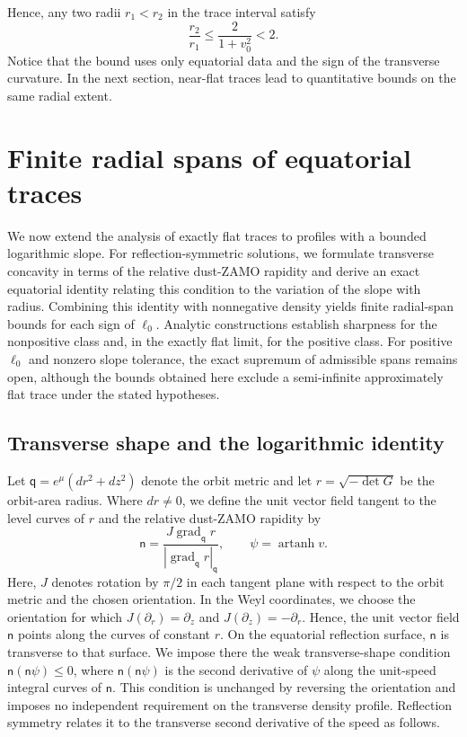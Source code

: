 \documentclass[amsmath,amsfonts,amssymb,aps,pra,superscriptaddress,10pt]{revtex4-2}
\numberwithin{equation}{section}
\theoremstyle{plain}
\theoremstyle{definition}
\theoremstyle{remark}
\theoremstyle{definition}
\newcommand{\ellzero}{\ell_0}
\begin{document}
Hence, any two radii $r_1<r_2$ in the trace interval satisfy
\begin{equation}
\frac{r_2}{r_1}\leq\frac{2}{1+v_0^2}<2.
\end{equation}
Notice that the bound uses only equatorial data and the sign of the transverse curvature. In the next section, near-flat traces lead to quantitative bounds on the same radial extent.


\section{Finite radial spans of equatorial traces}
\label{approxflatconstraint}

We now extend the analysis of exactly flat traces to profiles with a bounded logarithmic slope. For reflection-symmetric solutions, we formulate transverse concavity in terms of the relative dust-ZAMO rapidity and derive an exact equatorial identity relating this condition to the variation of the slope with radius. Combining this identity with nonnegative density yields finite radial-span bounds for each sign of $\ellzero$. Analytic constructions establish sharpness for the nonpositive class and, in the exactly flat limit, for the positive class. For positive $\ellzero$ and nonzero slope tolerance, the exact supremum of admissible spans remains open, although the bounds obtained here exclude a semi-infinite approximately flat trace under the stated hypotheses.

\subsection{Transverse shape and the logarithmic identity}

Let $\mathsf{q}=e^\mu(dr^2+dz^2)$ denote the orbit metric and let $r=\sqrt{-\det G}$ be the orbit-area radius. Where $dr\neq 0$, we define the unit vector field tangent to the level curves of $r$ and the relative dust-ZAMO rapidity by
\begin{equation}
\mathsf{n}=\frac{J\operatorname{grad}_{\mathsf{q}}r}
{\left|\operatorname{grad}_{\mathsf{q}}r\right|_{\mathsf{q}}},
\qquad 
\psi=\operatorname{artanh}{v}.
\end{equation}
Here, $J$ denotes rotation by $\pi/2$ in each tangent plane with respect to the orbit metric and the chosen orientation. In the Weyl coordinates, we choose the orientation for which 
$J(\partial_r)=\partial_z$ and $J(\partial_z)=-\partial_r$.  Hence, the unit vector field $\mathsf{n}$ points along the curves of constant $r$. On the equatorial reflection surface, $\mathsf{n}$ is transverse to that surface. We impose there the weak transverse-shape condition $\mathsf{n}(\mathsf{n}\psi)\leq 0$, where $\mathsf{n}(\mathsf{n}\psi)$ is the second derivative of $\psi$ along the unit-speed integral curves of $\mathsf{n}$. This condition is unchanged by reversing the orientation and imposes no independent requirement on the transverse density profile. Reflection symmetry relates it to the transverse second derivative of the speed as follows.
\end{document}
